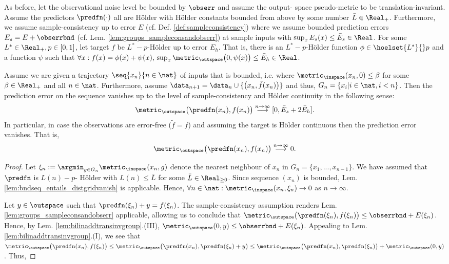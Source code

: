 \begin{lem}
As before, let the observational noise level be bounded by $\obserr$ and assume the output- space pseudo-metric to be translation-invariant. Assume the predictors $\predfn(\cdot)$ all are H\"older with H\"older constants bounded from above by some number $\bar L \in \Real_+$. 
Furthermore, we assume sample-consistency up to error $E$ (cf. Def. \ref{def:sampleconsistency}) where we assume bounded prediction errors $E_s = E + \obserrbnd$ (cf. Lem. \ref{lem:groups_sampleconsandobserr}) at sample inputs with $\sup_x E_s(x) \leq \bar E_s \in \Real$.
For some $L^* \in \Real_+, p \in [0,1]$, let target $f$ be $L^*-p$-H\"older up to error $E_h$. That is, there is an $L^*-p$-H\"older function $\phi \in \hoelset {L^*} { } p$ and a function $\psi$ such that $\forall x: f(x) = \phi(x)+\psi(x), \, \sup_x \metric_\outspace\bigl(0,\psi(x)\bigr) \leq \bar E_h \in \Real$.

Assume we are given a trajectory $\seq{x_n}{n \in \nat}$ of inputs that is bounded, i.e. where 
$\metric_\inspace(x_n,0) \leq \beta$ for some $\beta \in \Real_+$ and all $n \in \nat$.
Furthermore, assume $\data_{n+1} = \data_n \cup \{ \bigl(x_n, \tilde f(x_n)\bigr) \}$ and thus, $G_n = \{ x_i | i \in \nat, i < n\}$.
Then the prediction error on the sequence vanishes up to the level of sample-consistency and H\"older continuity in the following sense:
 \[\metric_\outspace\bigl(\predfn(x_n),f(x_n) \bigr) \stackrel{n \to \infty}{\longrightarrow} [0,\bar  E_s + 2 \bar E_h].\]
In particular, in case the observations are error-free ($\tilde f = f$) and assuming the target is H\"older continuous then the prediction error vanishes. That is,
\[\metric_\outspace\bigl(\predfn(x_n),f(x_n) \bigr) \stackrel{n \to \infty}{\longrightarrow}0.\]
\begin{proof}

Let $\xi_n := \argmin_{g \in G_n} \metric_\inspace(x_n,g)$ denote the nearest neighbour of $x_n$ in $G_n = \{x_1,...,x_{n-1}\}$.
We have assumed that $\predfn$ is $L(n)-p$- H\"older with $L(n) \leq \bar L$ for some $\bar L \in \Real_{\geq 0}$.
Since sequence $(x_n)$ is bounded, Lem. \ref{lem:bndseq_entails_distgridvanish} is applicable. 
Hence, $\forall n \in \nat: \metric_\inspace (x_n,\xi_n) \to 0$ as $n \to \infty$.

Let $y \in \outspace$ such that $\predfn(\xi_n) + y = f(\xi_n)$. The sample-consistency assumption renders Lem. \ref{lem:groups_sampleconsandobserr} applicable, allowing us to conclude that 
$\metric_\outspace\bigl(\predfn(\xi_n) ,  f(\xi_n)  \bigr) \leq \obserrbnd + E(\xi_n)$. Hence, by Lem. \ref{lem:bilinaddtransinvgroup}.(III), $\metric_\outspace(0,y) \leq \obserrbnd + E(\xi_n)$. Appealing to Lem. \ref{lem:bilinaddtransinvgroup}.(I), we see that 
$\metric_\outspace\bigl(\predfn(x_n) ,  f(\xi_n)  \bigr) \leq \metric_\outspace\bigl(\predfn(x_n) ,  \predfn(\xi_n)+y  \bigr) \leq 
\metric_\outspace\bigl(\predfn(x_n) ,  \predfn(\xi_n) \bigr) + \metric_\outspace(0,y)$. Thus, 


\end{proof}
\end{lem}
